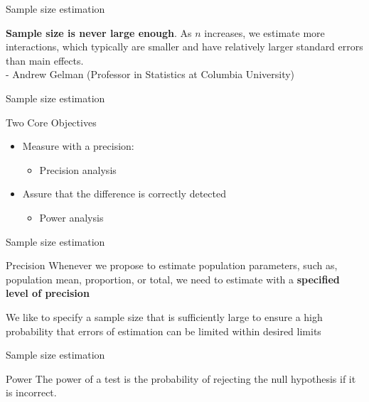 \documentclass[10pt]{beamer}\usepackage[]{graphicx}\usepackage[]{xcolor}
\begin{document}
\begin{frame}{Sample size estimation}

\begin{block}{}
\textbf{Sample size is never large enough}. As $n$ increases, we estimate more interactions,
which typically are smaller and have relatively larger standard errors than main
effects.\\ - Andrew Gelman (Professor in Statistics at Columbia University)
\end{block}

\end{frame}

\begin{frame}{Sample size estimation}

\begin{block}{}
Two Core Objectives
\end{block}

\begin{itemize}
\item Measure with a precision:
\begin{itemize}
\item Precision analysis
\end{itemize}
\item Assure that the difference is correctly detected
\begin{itemize}
\item Power analysis
\end{itemize}
\end{itemize}

\end{frame}

\begin{frame}{Sample size estimation}

\begin{block}{Precision}
Whenever we propose to estimate 
population parameters, such as, 
population mean, proportion, or total, 
we need to estimate with a \textbf{specified 
level of precision}
\end{block}

\begin{block}{}
We like to specify a sample size that 
is sufficiently large to ensure a high 
probability that errors of estimation 
can be limited within desired limits
\end{block}

\end{frame}

\begin{frame}{Sample size estimation}

\begin{block}{Power}
The power of a test is the probability of rejecting the null hypothesis 
if it is incorrect.
\end{block}
\end{frame}
\end{document}
